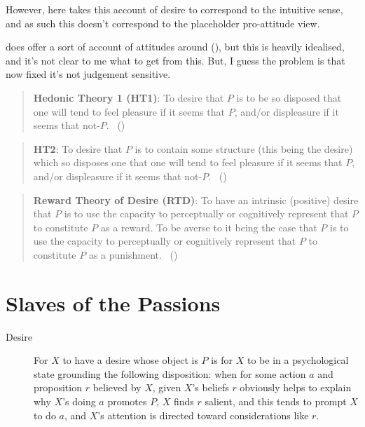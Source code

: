 \documentclass[10pt]{article}
\begin{document}
However, here \citeauthor{Scanlon:1998aa} takes this account of desire to correspond to the intuitive sense, and as such this doesn't correspond to the placeholder pro-attitude view.

\citeauthor{Scanlon:1998aa} does offer a sort of account of attitudes around (\citeyear[20]{Scanlon:1998aa}), but this is heavily idealised, and it's not clear to me what to get from this.
But, I guess the problem is that now fixed it's not judgement sensitive.


\begin{quote}
  \textbf{Hedonic Theory 1 (HT1)}:
  To desire that \(P\) is to be so disposed that one will tend to feel pleasure if it seems that \(P\), and/or displeasure if it seems that not-\(P\).\nolinebreak
  \mbox{ }\hfill(\citeyear[27]{Schroeder:2004aa})
\end{quote}

\begin{quote}
  \textbf{HT2}:
  To desire that \(P\) is to contain some structure (this being the desire) which so disposes one that one will tend to feel pleasure if it seems that \(P\), and/or displeasure if it seems that not-\(P\).\nolinebreak
  \mbox{ }\hfill(\citeyear[27]{Schroeder:2004aa})
\end{quote}


\begin{quote}
  \textbf{Reward Theory of Desire (RTD)}:
  To have an intrinsic (positive) desire that \(P\) is to use the capacity to perceptually or cognitively represent that \(P\) to constitute \(P\) as a reward.
  To be averse to it being the case that \(P\) is to use the capacity to perceptually or cognitively represent that \(P\) to constitute \(P\) as a punishment.\nolinebreak
  \mbox{ }\hfill(\citeyear[131]{Schroeder:2004aa})
\end{quote}



\section{Slaves of the Passions}
\label{sec:slaves-passions}

\begin{description}
\item[Desire]
For \(X\) to have a desire whose object is \(P\) is for \(X\) to be in a psychological state grounding the following disposition: when for some action \(a\) and proposition \(r\) believed by \(X\), given \(X\)'s beliefs \(r\) obviously helps to explain why \(X\)'s doing \(a\) promotes \(P\), \(X\) finds \(r\) salient, and this tends to prompt \(X\) to do \(a\), and \(X\)'s attention is directed toward considerations like \(r\).
\end{description}
\end{document}
